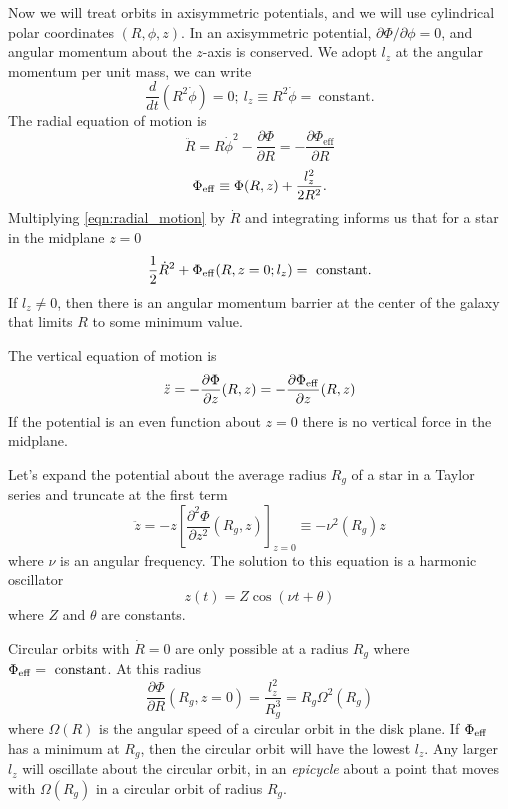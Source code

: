 \documentclass[]{article}
\begin{document}
Now we will treat orbits in axisymmetric potentials, and we will use cylindrical polar
coordinates $(R,\phi,z)$. In an axisymmetric potential, $\partial\Phi/\partial\phi = 0$, and
angular momentum about the $z$-axis is conserved.  We adopt $l_z$ at the angular
momentum per unit mass, we can write
\begin{equation}
\frac{d}{dt}(R^2 \dot{\phi}) = 0;~l_z \equiv R^2 \dot{\phi} =~\mathrm{constant}.
\end{equation}
\noindent
The radial equation of motion is
\begin{equation}
\label{eqn:radial_motion}
\ddot{R} = R \dot{\phi}^2 - \frac{\partial \Phi}{\partial R} = - \frac{\partial \Phi_{\mathrm{eff}}}{\partial R}
\end{equation}
\noindent
\begin{equation}
\Phi_\mathrm{eff} \equiv \Phi(R,z) + \frac{l_z^2}{2R^2}.
\end{equation}
Multiplying \ref{eqn:radial_motion} by $\dot{R}$ and integrating informs us that
for a star in the midplane $z=0$
\begin{equation}
\frac{1}{2}\dot{R}^2 + \Phi_\mathrm{eff}(R,z=0;l_z) = ~\mathrm{constant}.
\end{equation}
\noindent
If $l_z\ne0$, then there is an angular momentum barrier at the center of the galaxy that
limits $R$ to some minimum value.

The vertical equation of motion is
\begin{equation}
\ddot{z} = -\frac{\partial \Phi}{\partial z} (R,z) = -\frac{\partial \Phi_\mathrm{eff}}{\partial z} (R,z)
\end{equation}
\noindent
If the potential is an even function about $z=0$ there is no vertical force in the midplane.

Let's expand the potential about the average radius $R_g$ of a star in a Taylor series and
truncate at the first term
\begin{equation}
\ddot{z} = -z \left[ \frac{\partial^2 \Phi}{\partial z^2}(R_g, z)\right]_{z=0} \equiv - \nu^2(R_g) z
\end{equation}
\noindent
where $\nu$ is an angular frequency.  The solution to this equation is
a harmonic oscillator
\begin{equation}
z(t) = Z \cos (\nu t + \theta)
\end{equation}
\noindent
where $Z$ and $\theta$ are constants.

Circular orbits with $\dot{R} = 0$ are only possible at a radius $R_g$ where $\Phi_\mathrm{eff} =~\mathrm{constant}$.
At this radius
\begin{equation}
\frac{\partial \Phi}{\partial R}(R_g,z=0) = \frac{l_z^2}{R_g^3} = R_g \Omega^{2}(R_g)
\end{equation}
\noindent
where $\Omega(R)$ is the angular speed of a circular orbit in the disk plane.  If $\Phi_\mathrm{eff}$ has a
minimum at $R_g$, then the circular orbit will have the lowest $l_z$.  Any larger $l_z$
will oscillate about the circular orbit, in an {\it epicycle} about a point that
moves with $\Omega(R_g)$ in a circular orbit of radius $R_g$.
\end{document}
